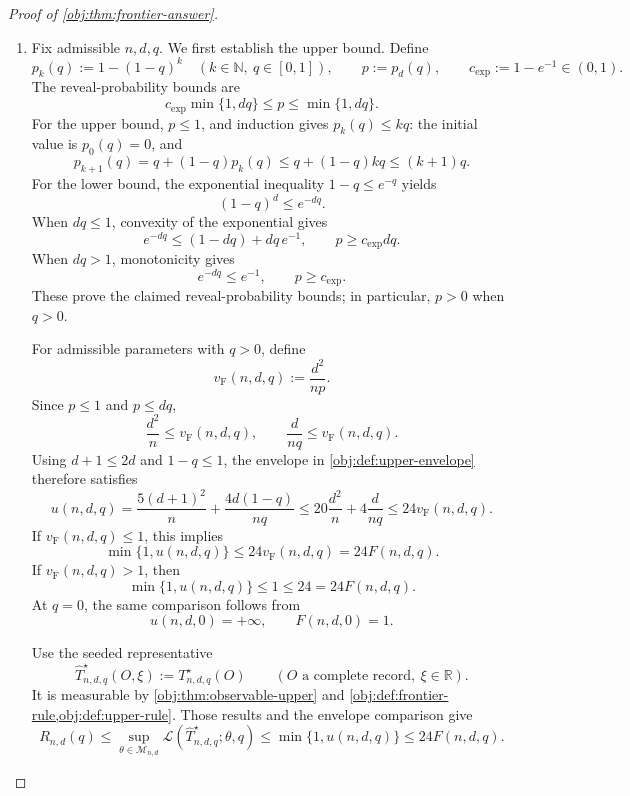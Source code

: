 \begin{proof}[Proof of \cref{obj:thm:frontier-answer}]
\begin{enumerate}
\item Fix admissible \(n,d,q\). We first establish the upper bound. Define
\[
p_k(q):=1-(1-q)^k
\quad(k\in\mathbb N,\ q\in[0,1]),
\qquad
p:=p_d(q),
\qquad
c_{\mathrm{exp}}:=1-e^{-1}\in(0,1).
\]
The reveal-probability bounds are
\[
c_{\mathrm{exp}}\min\{1,dq\}\le p\le\min\{1,dq\}.
\]
For the upper bound, \(p\le1\), and induction gives \(p_k(q)\le kq\): the initial value is \(p_0(q)=0\), and
\[
p_{k+1}(q)
=q+(1-q)p_k(q)
\le q+(1-q)kq
\le(k+1)q.
\]
For the lower bound, the exponential inequality \(1-q\le e^{-q}\) yields
\[
(1-q)^d\le e^{-dq}.
\]
When \(dq\le1\), convexity of the exponential gives
\[
e^{-dq}\le(1-dq)+dq\,e^{-1},
\qquad
p\ge c_{\mathrm{exp}}dq.
\]
When \(dq>1\), monotonicity gives
\[
e^{-dq}\le e^{-1},
\qquad
p\ge c_{\mathrm{exp}}.
\]
These prove the claimed reveal-probability bounds; in particular, \(p>0\) when \(q>0\).

For admissible parameters with \(q>0\), define
\[
v_{\mathrm{F}}(n,d,q):=\frac{d^2}{np}.
\]
Since \(p\le1\) and \(p\le dq\),
\[
\frac{d^2}{n}\le v_{\mathrm{F}}(n,d,q),
\qquad
\frac{d}{nq}\le v_{\mathrm{F}}(n,d,q).
\]
Using \(d+1\le2d\) and \(1-q\le1\), the envelope in
\cref{obj:def:upper-envelope} therefore satisfies
\[
u(n,d,q)
=\frac{5(d+1)^2}{n}+\frac{4d(1-q)}{nq}
\le20\frac{d^2}{n}+4\frac{d}{nq}
\le24v_{\mathrm{F}}(n,d,q).
\]
If \(v_{\mathrm{F}}(n,d,q)\le1\), this implies
\[
\min\{1,u(n,d,q)\}\le24v_{\mathrm{F}}(n,d,q)=24F(n,d,q).
\]
If \(v_{\mathrm{F}}(n,d,q)>1\), then
\[
\min\{1,u(n,d,q)\}\le1\le24=24F(n,d,q).
\]
At \(q=0\), the same comparison follows from
\[
u(n,d,0)=+\infty,
\qquad
F(n,d,0)=1.
\]

Use the seeded representative
\[
\widehat T^\star_{n,d,q}(O,\xi):=T^\star_{n,d,q}(O)
\qquad
(O\text{ a complete record},\ \xi\in\mathbb R).
\]
It is measurable by \cref{obj:thm:observable-upper} and
\cref{obj:def:frontier-rule,obj:def:upper-rule}. Those results and the envelope comparison give
\[
R_{n,d}(q)
\le
\sup_{\theta\in\mathcal M_{n,d}}
\mathcal L(\widehat T^\star_{n,d,q};\theta,q)
\le
\min\{1,u(n,d,q)\}
\le24F(n,d,q).
\]


\end{enumerate}
\end{proof}
